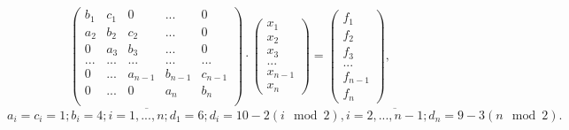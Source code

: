 \documentclass[12pt, a4paper]{article}
\begin{document}
\[
   \begin{pmatrix}
     b_1   &     c_1   &      0    &    ... & 0\\
     a_2 &     b_2   &      c_2    &   ... & 0\\
     0   &    a_3  &     b_3     &   ... & 0 \\
     ...   &    ...  &    ...     &   ... & ...\\ 
     0 & ...    &   a_{n-1}    &   b_{n-1}   &  c_{n-1} \\
     0 & ... & 0 & a_n & b_n\\
    \end{pmatrix} \cdot
    \begin{pmatrix}
 x_1\\
 x_2\\
x_3\\
...\\
x_{n-1}\\
x_n
    \end{pmatrix} =
\begin{pmatrix}
 f_1\\
 f_2\\
f_3\\
...\\
f_{n-1}\\
f_n
    \end{pmatrix},
\]
$a_i = c_i = 1; b_i = 4; i=\overline{1,...,n}; d_1 = 6; d_i = 10 - 2(i \mod 2), i = \overline{2,..., n-1}; d_n = 9 - 3(n \mod 2).$
\newpage
\end{document}

